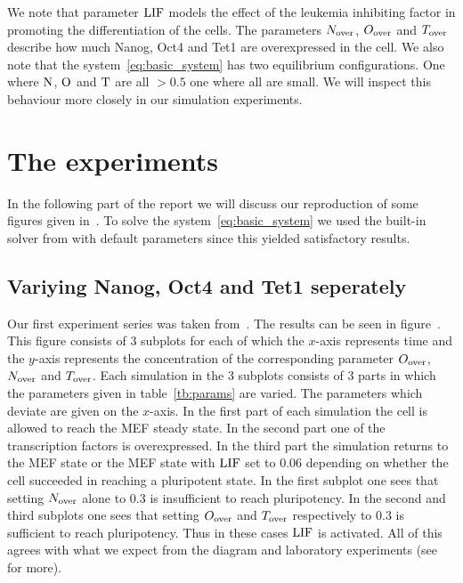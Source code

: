 We note that parameter $\text{LIF}$ models the effect of the leukemia inhibiting factor in promoting 
the differentiation of the cells. The parameters $N_\text{over}$, $O_\text{over}$ and $T_\text{over}$ describe how much
Nanog, Oct4 and Tet1 are overexpressed in the cell.
We also note that the system~\ref{eq:basic_system} has two equilibrium configurations.
One where $\text{N}$, $\text{O}$ and $\text{T}$ are all $>0.5$ one where all are small. We will inspect
this behaviour more closely in our simulation experiments.

\section{The experiments}

In the following part of the report we will discuss our reproduction of some figures given in~\cite{Olariu2016}.
To solve the system~\ref{eq:basic_system} we used the built-in solver from  with default parameters since this yielded satisfactory results.

\subsection{Variying Nanog, Oct4 and Tet1 seperately}

Our first experiment series was taken from~\cite{Olariu2016}.
The results can be seen in figure~\cite{fi:NOT_0.3}. This figure consists of 3 subplots 
for each of which the $x$-axis represents time and the $y$-axis represents the concentration of the 
corresponding parameter $O_\text{over}$, $N_\text{over}$ and $T_\text{over}$. Each simulation in the 3 subplots consists of 
3 parts in which the parameters given in table~\ref{tb:params} are varied. The parameters which deviate are
given on the $x$-axis. In the first part of each simulation the cell is allowed to reach the MEF steady state. 
In the second part one of the transcription factors is overexpressed.
In the third part the simulation returns to the MEF state or the MEF state with $\text{LIF}$ set to $0.06$
depending on whether the cell succeeded in reaching a pluripotent state.
In the first subplot one sees that setting $N_\text{over}$ alone to $0.3$ is insufficient to reach pluripotency.
In the second and third subplots one sees that setting $O_\text{over}$ and $T_\text{over}$ respectively to $0.3$ is sufficient
to reach pluripotency. Thus in these cases $\text{LIF}$ is activated.
All of this agrees with what we expect from the diagram and laboratory experiments (see~\cite{Olariu2016} for more).

